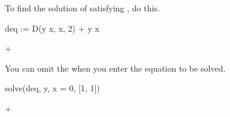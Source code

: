 {{{{{{{{{{{{{{{{\begin{xtc}
\begin{xtccomment}
To find the solution of  satisfying ,
do this.
\end{xtccomment}
\begin{spadsrc}
deq := D(y x, x, 2) + y x 
\end{spadsrc}
\begin{TeXOutput}
\begin{fricasmath}{4}
+%
\end{fricasmath}
\end{TeXOutput}
\end{xtc}
\begin{xtc}
\begin{xtccomment}
You can omit the  when you enter the equation to be solved.
\end{xtccomment}
\begin{spadsrc}
solve(deq, y, x = 0, [1, 1]) 
\end{spadsrc}
\begin{TeXOutput}
\begin{fricasmath}{5}
+%
\end{fricasmath}
\end{TeXOutput}
\end{xtc}
%

}}}}}}}}}}}}}}}}
